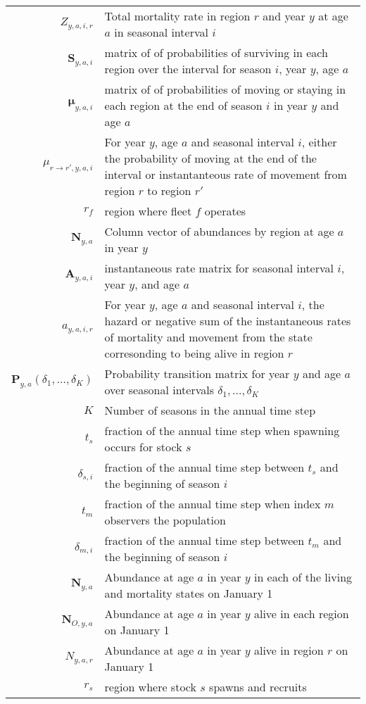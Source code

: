 \begin{longtable}[c]{r p{}}
$Z_{y,a,i,r}$ & Total mortality rate in region $r$ and year $y$ at age $a$ in seasonal interval $i$\\
$\mathbf{S}_{y,a,i}$ & matrix of of probabilities of surviving in each region over the interval for season $i$, year $y$, age $a$ \\
$\boldsymbol{\mu}_{y,a,i}$ & matrix of of probabilities of moving or staying in each region at the end of season $i$ in year $y$ and age $a$ \\
$\mu_{r\rightarrow r',y,a,i}$ & For year $y$, age $a$ and seasonal interval $i$, either the probability of moving at the end of the interval or instantanteous rate of movement from region $r$ to region $r'$\\
$r_f$ & region where fleet $f$ operates\\
$\mathbf{N}_{y,a}$ & Column vector of abundances by region at age $a$ in year $y$\\
$\mathbf{A}_{y,a,i}$ & instantaneous rate matrix for seasonal interval $i$, year $y$, and age $a$\\
$a_{y,a,i,r}$ & For year $y$, age $a$ and seasonal interval $i$, the hazard or negative sum of the instantaneous rates of mortality and movement from the state corresonding to being alive in region $r$ \\
$\mathbf{P}_{y,a}(\delta_1,\ldots,\delta_K)$ & Probability transition matrix for year $y$ and age $a$ over seasonal intervals $\delta_1,\ldots, \delta_K$\\
$K$ & Number of seasons in the annual time step\\
$t_s$ & fraction of the annual time step when spawning occurs for stock $s$\\
$\delta_{s,i}$ & fraction of the annual time step between $t_s$ and the beginning of season $i$\\
$t_m$ & fraction of the annual time step when index $m$ observers the population\\
$\delta_{m,i}$ & fraction of the annual time step between $t_m$ and the beginning of season $i$\\
$\mathbf{N}_{y,a}$ & Abundance at age $a$ in year $y$ in each of the living and mortality states on January 1\\
$\mathbf{N}_{O,y,a}$ & Abundance at age $a$ in year $y$ alive in each region on January 1\\
$N_{y,a,r}$ & Abundance at age $a$ in year $y$ alive in region $r$ on January 1\\
$r_s$ & region where stock $s$ spawns and recruits\\

\end{longtable}
